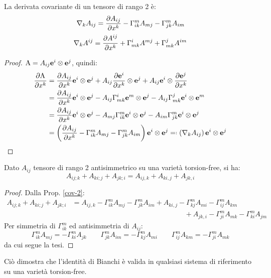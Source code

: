 \begin{proposition}\label{cov-2}
	La derivata covariante di un tensore di rango 2 è:
	\begin{equation}
		\nabla_k A_{ij} = \frac{\partial A_{ij}}{\partial x^k} - \Gamma^m_{ik} A_{mj} - \Gamma^m_{jk} A_{im}
		\label{eq:4.12}
	\end{equation}
	\begin{equation}
		\nabla_k A^{ij} = \frac{\partial A^{ij}}{\partial x^k} + \Gamma^i_{mk} A^{mj} + \Gamma^j_{mk} A^{im}
		\label{eq:4.13}
	\end{equation}
\end{proposition}
\begin{proof}
	$ \mathbf{\text{A}} = A_{ij} \mathbf{e}^i \otimes \mathbf{e}^j $, quindi:
	\begin{equation*}
		\begin{split}
			\frac{\pa \tens{A}}{\pa x^k}
			&= \frac{\pa A_{ij}}{\pa x^k} \ve{e}^i \otimes \ve{e}^j + A_{ij} \frac{\pa\ve{e}^i}{\pa x^k} \otimes \ve{e}^j + A_{ij} \ve{e}^i \otimes \frac{\pa\ve{e}^j}{\pa x^k}\\
			&= \frac{\pa A_{ij}}{\pa x^k} \ve{e}^i \otimes \ve{e}^j - A_{ij} \Gamma^i_{mk} \ve{e}^m \otimes \ve{e}^j - A_{ij} \Gamma^j_{mk} \ve{e}^i \otimes \ve{e}^m\\
			&= \frac{\pa A_{ij}}{\pa x^k} \ve{e}^i \otimes \ve{e}^j - A_{mj} \Gamma^m_{ik} \ve{e}^i \otimes \ve{e}^j - A_{im} \Gamma^m_{jk} \ve{e}^i \otimes \ve{e}^j\\
			&= \left( \frac{\pa A_{ij}}{\pa x^k} - \Gamma^m_{ik} A_{mj} - \Gamma^m_{jk} A_{im} \right) \ve{e}^i \otimes \ve{e}^j \eqdef \left( \nabla_k A_{ij} \right) \ve{e}^i \otimes \ve{e}^j
		\end{split}
	\end{equation*}
\end{proof}

\begin{proposition}
	Dato $ A_{ij} $ tensore di rango 2 antisimmetrico su una varietà torsion-free, si ha:
	\begin{equation}
		A_{ij;k} + A_{ki;j} + A_{jk;i} = A_{ij,k} + A_{ki,j} + A_{jk,i}
		\label{eq:4.14}
	\end{equation}
\end{proposition}
\begin{proof}
	Dalla Prop. \ref{cov-2}:
	\begin{equation*}
		\begin{split}
			A_{ij;k} + A_{ki;j} + A_{jk;i}
			&= A_{ij,k} - \Gamma^m_{ik} A_{mj} - \Gamma^m_{jk} A_{im} + A_{ki,j} - \Gamma^m_{kj} A_{mi} - \Gamma^m_{ij} A_{km} \\ &\qquad \qquad \qquad \qquad \qquad \qquad \qquad \qquad + A_{jk,i} - \Gamma^m_{ji} A_{mk} - \Gamma^m_{ki} A_{jm}
		\end{split}
	\end{equation*}
	Per simmetria di $ \Gamma^m_{ik} $ ed antisimmetria di $ A_{ij} $:
	\begin{equation*}
		\Gamma^m_{ik} A_{mj} = - \Gamma^m_{ki} A_{jk} \qquad \Gamma^m_{jk} A_{im} = - \Gamma^m_{kj} A_{mi} \qquad \Gamma^m_{ij} A_{km} = - \Gamma^m_{ji} A_{mk}
	\end{equation*}
	da cui segue la tesi.
\end{proof}

Ciò dimostra che l'identità di Bianchi è valida in qualsiasi sistema di riferimento su una varietà torsion-free.










